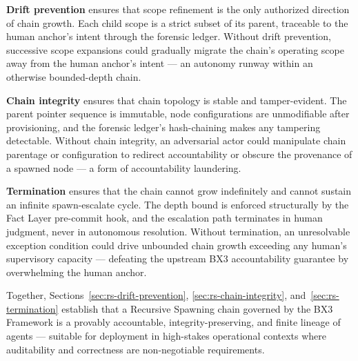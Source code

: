 \textbf{Drift prevention} ensures that scope refinement is the only authorized direction of chain growth. Each child scope is a strict subset of its parent, traceable to the human anchor's intent through the forensic ledger. Without drift prevention, successive scope expansions could gradually migrate the chain's operating scope away from the human anchor's intent --- an autonomy runway within an otherwise bounded-depth chain.

\textbf{Chain integrity} ensures that chain topology is stable and tamper-evident. The parent pointer sequence is immutable, node configurations are unmodifiable after provisioning, and the forensic ledger's hash-chaining makes any tampering detectable. Without chain integrity, an adversarial actor could manipulate chain parentage or configuration to redirect accountability or obscure the provenance of a spawned node --- a form of accountability laundering.

\textbf{Termination} ensures that the chain cannot grow indefinitely and cannot sustain an infinite spawn-escalate cycle. The depth bound is enforced structurally by the Fact Layer pre-commit hook, and the escalation path terminates in human judgment, never in autonomous resolution. Without termination, an unresolvable exception condition could drive unbounded chain growth exceeding any human's supervisory capacity --- defeating the upstream BX3 accountability guarantee by overwhelming the human anchor.

Together, Sections~\ref{sec:rs-drift-prevention}, \ref{sec:rs-chain-integrity}, and~\ref{sec:rs-termination} establish that a Recursive Spawning chain governed by the BX3 Framework is a provably accountable, integrity-preserving, and finite lineage of agents --- suitable for deployment in high-stakes operational contexts where auditability and correctness are non-negotiable requirements.

